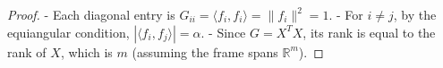 \documentclass[12pt]{article}
\begin{document}
\begin{proof}
- Each diagonal entry is $G_{ii} = \langle f_i, f_i \rangle = \|f_i\|^2 = 1$.
- For $i \ne j$, by the equiangular condition, $|\langle f_i, f_j \rangle| = \alpha$.
- Since $G = X^T X$, its rank is equal to the rank of $X$, which is $m$ (assuming the frame spans $\mathbb{R}^m$).
\end{proof}
\end{document}
